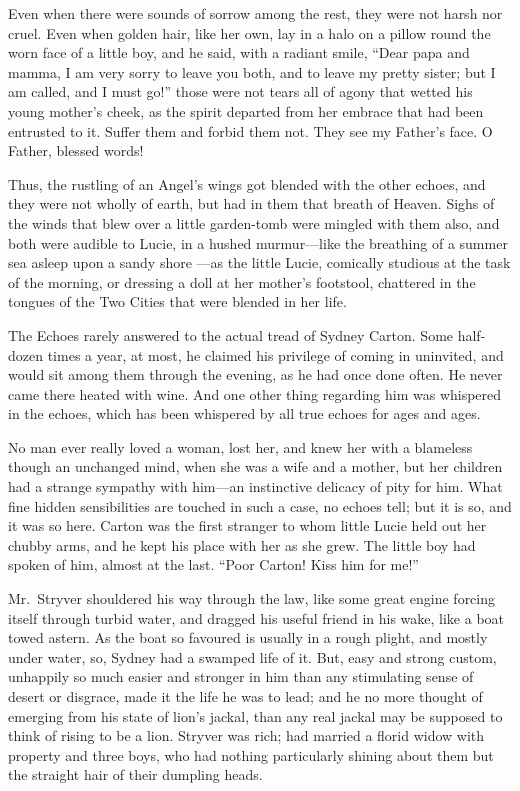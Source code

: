 Even when there were sounds of sorrow among the rest, they were not
harsh nor cruel.  Even when golden hair, like her own, lay in a halo
on a pillow round the worn face of a little boy, and he said, with a
radiant smile, ``Dear papa and mamma, I am very sorry to leave you both,
and to leave my pretty sister; but I am called, and I must go!''
those were not tears all of agony that wetted his young mother's cheek,
as the spirit departed from her embrace that had been entrusted to it.
Suffer them and forbid them not.  They see my Father's face.
O Father, blessed words!

Thus, the rustling of an Angel's wings got blended with the other
echoes, and they were not wholly of earth, but had in them that breath
of Heaven.  Sighs of the winds that blew over a little garden-tomb were
mingled with them also, and both were audible to Lucie, in a hushed
murmur---like the breathing of a summer sea asleep upon a sandy shore%
---as the little Lucie, comically studious at the task of the morning,
or dressing a doll at her mother's footstool, chattered in the
tongues of the Two Cities that were blended in her life.

The Echoes rarely answered to the actual tread of Sydney Carton.
Some half-dozen times a year, at most, he claimed his privilege of coming
in uninvited, and would sit among them through the evening, as he had
once done often.  He never came there heated with wine.  And one other
thing regarding him was whispered in the echoes, which has been
whispered by all true echoes for ages and ages.

No man ever really loved a woman, lost her, and knew her with a
blameless though an unchanged mind, when she was a wife and a mother,
but her children had a strange sympathy with him---an instinctive
delicacy of pity for him.  What fine hidden sensibilities are touched
in such a case, no echoes tell; but it is so, and it was so here.
Carton was the first stranger to whom little Lucie held out her chubby
arms, and he kept his place with her as she grew.  The little boy had
spoken of him, almost at the last.  ``Poor Carton!  Kiss him for me!''

Mr.\ Stryver shouldered his way through the law, like some great engine
forcing itself through turbid water, and dragged his useful friend in
his wake, like a boat towed astern.  As the boat so favoured is usually
in a rough plight, and mostly under water, so, Sydney had a swamped life
of it.  But, easy and strong custom, unhappily so much easier and
stronger in him than any stimulating sense of desert or disgrace, made
it the life he was to lead; and he no more thought of emerging from his
state of lion's jackal, than any real jackal may be supposed to think
of rising to be a lion.  Stryver was rich; had married a florid widow
with property and three boys, who had nothing particularly shining about
them but the straight hair of their dumpling heads.

